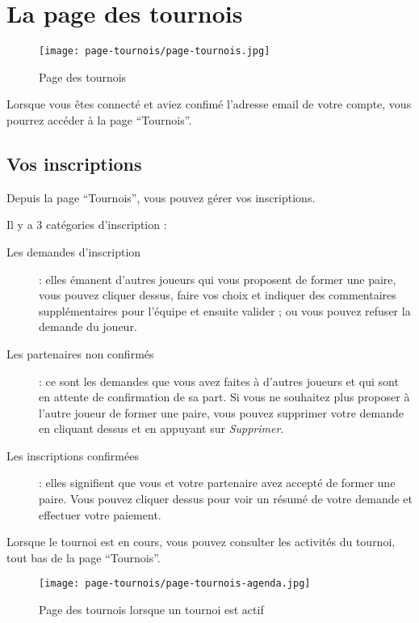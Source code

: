 \section{La page des tournois}

\begin{figure}[H]
\centering
\texttt{[image: page-tournois/page-tournois.jpg]}
\caption{Page des tournois}
\end{figure}

Lorsque vous êtes connecté et aviez confimé l'adresse email de votre compte, vous pourrez accéder à la page \enquote{Tournois}.

\subsection{Vos inscriptions}

Depuis la page \enquote{Tournois}, vous pouvez gérer vos inscriptions. \newline

Il y a 3 catégories d'inscription : \newline

\begin{description}
    \item[Les demandes d'inscription] : elles émanent d'autres joueurs qui
    vous proposent de former une paire, vous pouvez cliquer dessus, faire vos
    choix et indiquer des commentaires supplémentaires pour l'équipe et ensuite
    valider ; ou vous pouvez refuser la demande du joueur.
    \item[Les partenaires non confirmés] : ce sont les demandes que vous avez
    faites à d'autres joueurs et qui sont en attente de confirmation de sa part.
    Si vous ne souhaitez plus proposer à l'autre joueur de former une paire,
    vous pouvez supprimer votre demande en cliquant dessus et en appuyant sur
    \textit{Supprimer}.
    \item[Les inscriptions confirmées] : elles signifient que vous et votre
    partenaire avez accepté de former une paire. Vous pouvez cliquer dessus
    pour voir un résumé de votre demande et effectuer votre paiement.
\end{description}

Lorsque le tournoi est en cours, vous pouvez consulter les activités du
tournoi, tout bas de la page \enquote{Tournois}.

\begin{figure}[H]
\centering
\texttt{[image: page-tournois/page-tournois-agenda.jpg]}
\caption{Page des tournois lorsque un tournoi est actif}
\end{figure}

